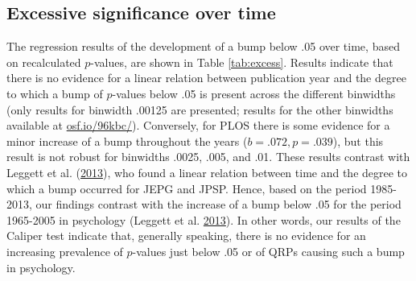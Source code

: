 \documentclass[a5paper]{book}
\begin{document}
\subsection{Excessive significance over
time}\label{excessive-significance-over-time}

The regression results of the development of a bump below .05 over time,
based on recalculated \(p\)-values, are shown in Table \ref{tab:excess}.
Results indicate that there is no evidence for a linear relation between
publication year and the degree to which a bump of \(p\)-values below
.05 is present across the different binwidths (only results for binwidth
.00125 are presented; results for the other binwidths available at
\href{https://osf.io/96kbc/}{osf.io/96kbc/}). Conversely, for PLOS there
is some evidence for a minor increase of a bump throughout the years
(\(b=.072,p=.039\)), but this result is not robust for binwidths .0025,
.005, and .01. These results contrast with Leggett et al.
(\protect\hyperlink{ref-doi:10.1080ux2f17470218.2013.863371}{2013}), who
found a linear relation between time and the degree to which a bump
occurred for JEPG and JPSP. Hence, based on the period 1985-2013, our
findings contrast with the increase of a bump below .05 for the period
1965-2005 in psychology (Leggett et al.
\protect\hyperlink{ref-doi:10.1080ux2f17470218.2013.863371}{2013}). In
other words, our results of the Caliper test indicate that, generally
speaking, there is no evidence for an increasing prevalence of
\(p\)-values just below .05 or of QRPs causing such a bump in
psychology.
\end{document}
